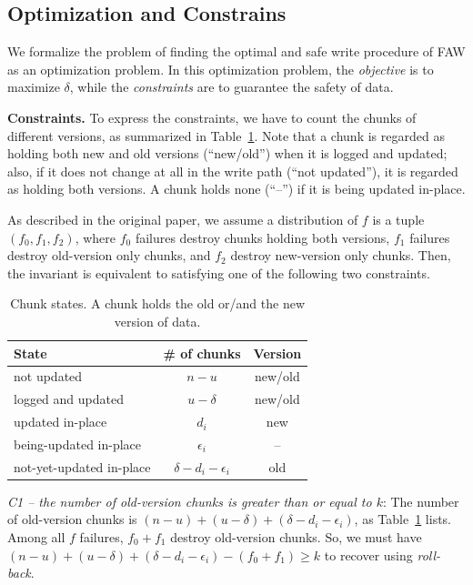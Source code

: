 \documentclass[letterpaper,10pt,twocolumn]{article}
\def\protocol/{FAW}
\begin{document}
\subsection{Optimization and Constrains}

We formalize the problem of finding the optimal and safe write procedure of \protocol/ as an optimization problem. 
In this optimization problem, the \emph{objective} is to maximize $\delta$, while the \emph{constraints} are to guarantee the safety of data.

\noindent
\textbf{Constraints.} To express the constraints, we have to count the chunks of different versions, as summarized in Table~\ref{tab:states}.
Note that a chunk is regarded as holding both new and old versions (``new/old'') when it is logged and updated; also, if it does not change at all in the write
path (``not updated''), it is regarded as holding both versions. A chunk
holds none (``--'') if it is being updated in-place.

As described in the original paper, we assume a distribution of $f$ is a tuple $(f_0, f_1, f_2)$, where $f_0$ failures destroy
chunks holding both versions, $f_1$ failures destroy old-version only chunks,
and $f_2$ destroy new-version only chunks. Then, the invariant is equivalent to
satisfying one of the following two constraints.

\begin{table}[!b]
\centering
\begin{tabular}{l|c|c}
\hline
State & \# of chunks & Version \\
\hline
not updated & $n - u$ & new/old \\
logged and updated & $u - \delta$ & new/old \\
updated in-place & $d_i$ & new \\
being-updated in-place & $\epsilon_i$ & -- \\
not-yet-updated in-place & $\delta - d_i - \epsilon_i$ & old \\
\hline
\end{tabular}
\caption{Chunk states. A chunk holds the old or/and the new version of data.  }
\label{tab:states}
\end{table}

\emph{C1 -- the number of old-version chunks is greater than or equal to $k$}: The number of old-version chunks is $(n -
u) + (u - \delta) + (\delta - d_i - \epsilon_i)$, as Table~\ref{tab:states}
lists. Among all $f$ failures, $f_0 + f_1$ destroy old-version chunks.
So, we must have $(n - u) + (u - \delta) + (\delta -
d_i - \epsilon_i) - (f_0 + f_1) \ge k$ to recover using \emph{roll-back}.
\end{document}
